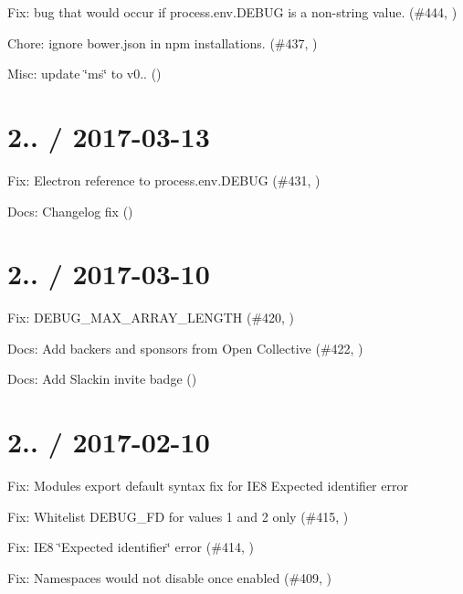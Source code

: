 \begin{DoxyItemize}
\item Fix\+: bug that would occur if process.\+env.\+D\+E\+B\+UG is a non-\/string value. (\#444, )
\item Chore\+: ignore bower.\+json in npm installations. (\#437, )
\item Misc\+: update \char`\"{}ms\char`\"{} to v0.. ()
\end{DoxyItemize}

\section*{2.. / 2017-\/03-\/13 }


\begin{DoxyItemize}
\item Fix\+: Electron reference to {\ttfamily process.\+env.\+D\+E\+B\+UG} (\#431, )
\item Docs\+: Changelog fix ()
\end{DoxyItemize}

\section*{2.. / 2017-\/03-\/10 }


\begin{DoxyItemize}
\item Fix\+: D\+E\+B\+U\+G\+\_\+\+M\+A\+X\+\_\+\+A\+R\+R\+A\+Y\+\_\+\+L\+E\+N\+G\+TH (\#420, )
\item Docs\+: Add backers and sponsors from Open Collective (\#422, )
\item Docs\+: Add Slackin invite badge ()
\end{DoxyItemize}

\section*{2.. / 2017-\/02-\/10 }


\begin{DoxyItemize}
\item Fix\+: Module\textquotesingle{}s {\ttfamily export default} syntax fix for I\+E8 {\ttfamily Expected identifier} error
\item Fix\+: Whitelist D\+E\+B\+U\+G\+\_\+\+FD for values 1 and 2 only (\#415, )
\item Fix\+: I\+E8 \char`\"{}\+Expected identifier\char`\"{} error (\#414, )
\item Fix\+: Namespaces would not disable once enabled (\#409, )
\end{DoxyItemize}

